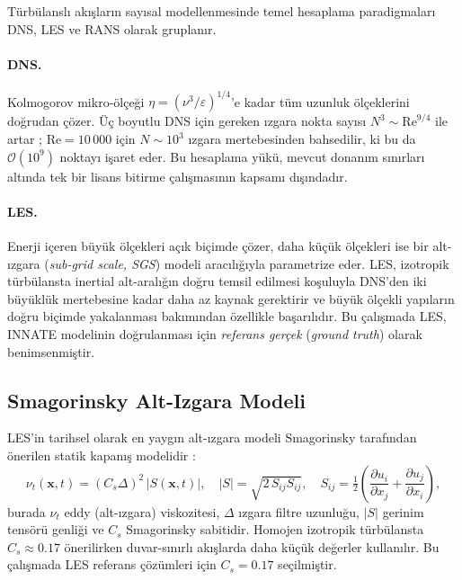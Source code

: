 Türbülanslı akışların sayısal modellenmesinde temel hesaplama paradigmaları DNS, LES ve RANS olarak gruplanır.

\paragraph{DNS.} Kolmogorov mikro-ölçeği $\eta=(\nu^{3}/\varepsilon)^{1/4}$'e kadar tüm uzunluk ölçeklerini doğrudan çözer. Üç boyutlu DNS için gereken ızgara nokta sayısı $N^{3}\sim\mathrm{Re}^{9/4}$ ile artar \cite{pope_turbulence_2000}; $\mathrm{Re}=10\,000$ için $N\sim 10^{3}$ ızgara mertebesinden bahsedilir, ki bu da $\mathcal{O}(10^{9})$ noktayı işaret eder. Bu hesaplama yükü, mevcut donanım sınırları altında tek bir lisans bitirme çalışmasının kapsamı dışındadır.

\paragraph{LES.} Enerji içeren büyük ölçekleri açık biçimde çözer, daha küçük ölçekleri ise bir alt-ızgara (\textit{sub-grid scale, SGS}) modeli aracılığıyla parametrize eder. LES, izotropik türbülansta inertial alt-aralığın doğru temsil edilmesi koşuluyla DNS'den iki büyüklük mertebesine kadar daha az kaynak gerektirir ve büyük ölçekli yapıların doğru biçimde yakalanması bakımından özellikle başarılıdır. Bu çalışmada LES, INNATE modelinin doğrulanması için \emph{referans gerçek} (\textit{ground truth}) olarak benimsenmiştir.

\subsection{Smagorinsky Alt-Izgara Modeli}

LES'in tarihsel olarak en yaygın alt-ızgara modeli Smagorinsky tarafından önerilen statik kapanış modelidir \cite{smagorinsky_1963}:
\begin{equation}
\nu_{t}(\mathbf{x},t) = (C_{s}\Delta)^{2}\,|S(\mathbf{x},t)|,
\quad |S| = \sqrt{2\,S_{ij}S_{ij}},
\quad S_{ij}=\tfrac{1}{2}\left(\frac{\partial u_{i}}{\partial x_{j}}+\frac{\partial u_{j}}{\partial x_{i}}\right),
\label{eq:smagorinsky}
\end{equation}
burada $\nu_{t}$ eddy (alt-ızgara) viskozitesi, $\Delta$ ızgara filtre uzunluğu, $|S|$ gerinim tensörü genliği ve $C_{s}$ Smagorinsky sabitidir. Homojen izotropik türbülansta $C_{s}\approx 0.17$ önerilirken duvar-sınırlı akışlarda daha küçük değerler kullanılır. Bu çalışmada LES referans çözümleri için $C_{s}=0.17$ seçilmiştir.

